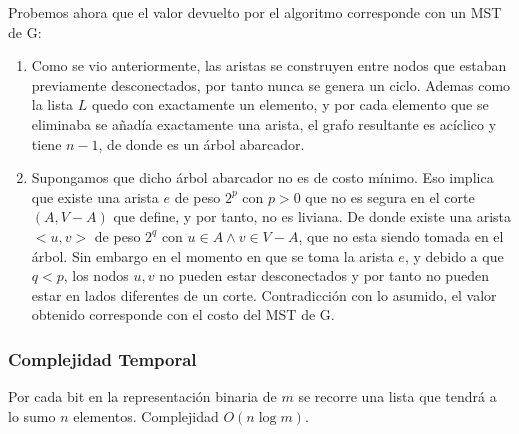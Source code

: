 \documentclass{article}
\begin{document}
Probemos ahora que el valor devuelto por el algoritmo corresponde con un MST de G:

\begin{enumerate}
    \item Como se vio anteriormente, las aristas se construyen entre nodos que estaban previamente desconectados, por tanto nunca se genera un ciclo. Ademas como la lista $L$ quedo con exactamente un elemento, y por cada elemento que se eliminaba se añadía exactamente una arista, el grafo resultante es acíclico y tiene $n -1$, de donde es un árbol abarcador.
    \item Supongamos que dicho árbol abarcador no es de costo mínimo. Eso implica que existe una arista $e$ de peso $2^p$ con $p > 0$ que no es segura en el corte $(A, V - A)$ que define, y por tanto, no es liviana. De donde existe una arista $<u, v>$ de peso $2^q$ con $u \in A \land v \in V - A$, que no esta siendo tomada en el árbol. Sin embargo en el momento en que se toma la arista $e$, y debido a que $q < p$, los nodos $u, v$ no pueden estar desconectados y por tanto no pueden estar en lados diferentes de un corte. Contradicción con lo asumido, el valor obtenido corresponde con el costo del MST de G.    
\end{enumerate}

\subsubsection{Complejidad Temporal}

Por cada bit en la representación binaria de $m$ se recorre una lista que tendrá a lo sumo $n$ elementos. Complejidad $O(n \log m)$.
\end{document}
